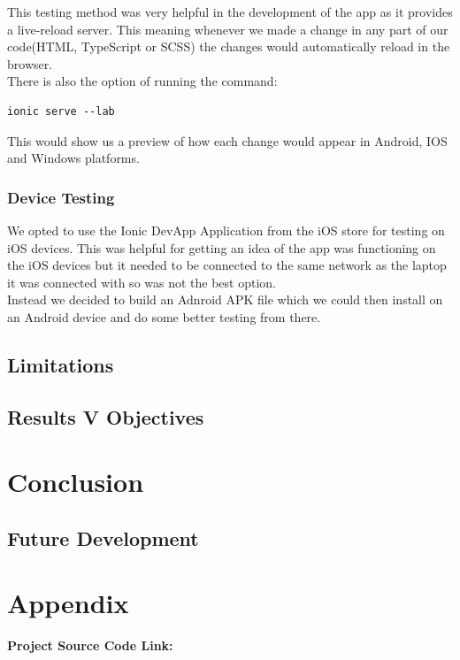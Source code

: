 \documentclass[12pt,a4paper,oneside,openany]{book}
\begin{document}
This testing method was very helpful in the development of the app as it provides a live-reload server. This meaning whenever we made a change in any part of our code(HTML, TypeScript or SCSS) the changes would automatically reload in the browser.
\\
There is also the option of running the command:
\begin{verbatim}
ionic serve --lab
\end{verbatim}

This would show us a preview of how each change would appear in Android, IOS and Windows platforms.

\subsection{Device Testing}
We opted to use the Ionic DevApp Application from the iOS store for testing on iOS devices. This was helpful for getting an idea of the app was functioning on the iOS devices but it needed to be connected to the same network as the laptop it was connected with so was not the best option.\\

\noindent
Instead we decided to build an Adnroid APK file which we could then install on an Android device and do some better testing from there.

\section{Limitations}

\section{Results V Objectives}

\chapter{Conclusion}

\section{Future Development}

\chapter{Appendix}

\textbf{Project Source Code Link:} \\




\nocite{*}
\end{document}
